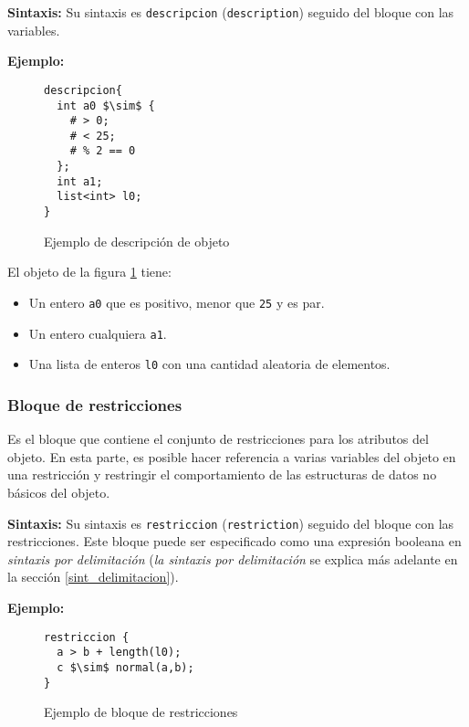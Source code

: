 \textbf{Sintaxis:} Su sintaxis es \texttt{descripcion} (\texttt{description}) seguido del 
bloque con las variables.

\textbf{Ejemplo:}
\begin{figure}[h]
\begin{lstlisting}[mathescape]
descripcion{
  int a0 $\sim$ {
    # > 0;
    # < 25;
    # % 2 == 0
  };
  int a1;
  list<int> l0;
}
\end{lstlisting}
\caption[Ejemplo de descripción de objeto]
{Ejemplo de descripción de objeto}
\label{ejemplo_de_descripcion}
\end{figure}

El objeto de la figura \ref{ejemplo_de_descripcion} tiene:
\begin{itemize}
 \item {Un entero \texttt{a0} que es positivo, menor que \texttt{25} y es par.}
 \item {Un entero cualquiera \texttt{a1}.}
 \item {Una lista de enteros \texttt{l0} con una cantidad aleatoria de elementos.}
\end{itemize}

\subsubsection{Bloque de restricciones} \label{subsec:restricciones}
Es el bloque que contiene el conjunto de restricciones para los atributos del 
objeto. En esta parte, es posible hacer referencia a varias variables del objeto 
en una restricción y restringir el comportamiento de las estructuras de datos no
básicos del objeto.	

\textbf{Sintaxis:} Su sintaxis es \texttt{restriccion} (\texttt{restriction}) seguido del 
bloque con las restricciones. Este bloque puede ser especificado como una 
expresión booleana en\emph{ sintaxis por delimitación} (\emph{la sintaxis por delimitación}
se explica más adelante en la sección \ref{sint_delimitacion}).

\textbf{Ejemplo:}
\begin{figure}[h]
\begin{lstlisting}[mathescape]
restriccion {
  a > b + length(l0);
  c $\sim$ normal(a,b);
}
\end{lstlisting}
\caption[Ejemplo de bloque de restricciones]
{Ejemplo de bloque de restricciones}
\label{ejemplo_de_bloque_de_restricciones}
\end{figure}

